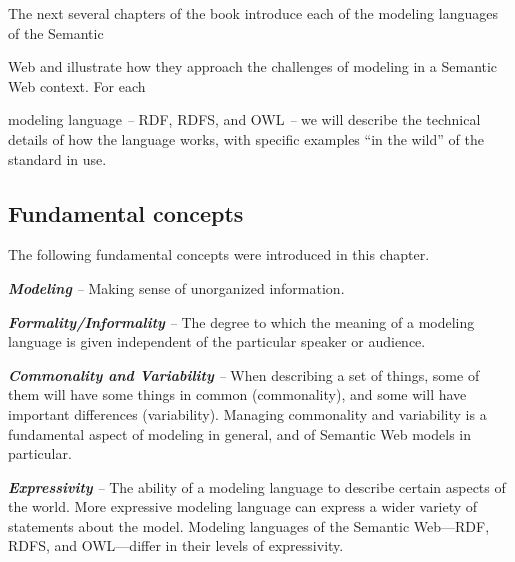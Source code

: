 The next several chapters of the book introduce each of the modeling
languages of the Semantic

Web and illustrate how they approach the challenges of modeling in a
Semantic Web context. For each

modeling language \emph{--} RDF, RDFS, and OWL \emph{--} we will
describe the technical details of how the language works, with specific
examples ``in the wild'' of the standard in use.

\subsection{Fundamental concepts}

The following fundamental concepts were introduced in this chapter.

\emph{\textbf{Modeling}} \emph{--} Making sense of unorganized
information.

\emph{\textbf{Formality/Informality}} \emph{--} The degree to which the
meaning of a modeling language is given independent of the particular
speaker or audience.

\emph{\textbf{Commonality and Variability}} \emph{--} When describing a
set of things, some of them will have some things in common
(commonality), and some will have important differences (variability).
Managing commonality and variability is a fundamental aspect of modeling
in general, and of Semantic Web models in particular.

\emph{\textbf{Expressivity}} \emph{--} The ability of a modeling
language to describe certain aspects of the world. More expressive
modeling language can express a wider variety of statements about the
model. Modeling languages of the Semantic Web---RDF, RDFS, and
OWL---differ in their levels of expressivity.
